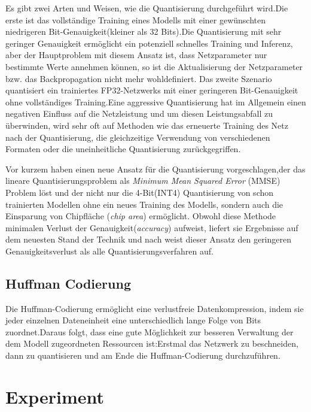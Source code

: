\documentclass[12pt,a4paper]{scrartcl}
\numberwithin{equation}{section}
\begin{document}
Es gibt zwei Arten und Weisen, wie die Quantisierung durchgeführt wird.Die erste ist das vollständige Training eines Modells mit einer gewünschten niedrigeren Bit-Genauigkeit(kleiner als 32 Bits).Die Quantisierung mit sehr geringer Genauigkeit ermöglicht ein potenziell schnelles Training und Inferenz, aber der Hauptproblem mit diesem Ansatz ist, dass Netzparameter nur bestimmte Werte annehmen können, so ist die Aktualisierung der Netzparameter bzw. das Backpropagation nicht mehr wohldefiniert.
Das zweite Szenario  quantisiert ein trainiertes FP32-Netzwerks mit einer geringeren Bit-Genauigkeit ohne vollständiges Training.Eine aggressive Quantisierung hat im Allgemein einen negativen Einfluss auf die Netzleistung und um diesen Leistungsabfall zu überwinden, wird sehr oft auf Methoden wie das erneuerte Training des Netz nach der Quantisierung, die gleichzeitige Verwendung von verschiedenen Formaten oder die uneinheitliche Quantisierung zurückgegriffen.

Vor kurzem haben \cite[Yoni et al]{quantizationYoni} einen neue Ansatz für die Quantisierung vorgeschlagen,der das lineare Quantisierungsproblem als \textit{Minimum Mean Squared Error} (MMSE) Problem löst und der nicht nur die 4-Bit(INT4) Quantisierung von schon trainierten Modellen ohne ein neues Training des Modells, sondern auch die Einsparung von Chipfläche (\textit{chip area}) ermöglicht. Obwohl diese Methode  minimalen Verlust der Genauigkeit(\textit{accuracy}) aufweist, liefert sie Ergebnisse auf dem neuesten Stand der Technik und nach \cite{quantizationYoni} weist dieser Ansatz den geringeren Genauigkeitsverlust als alle Quantisierungsverfahren auf.

\subsection{Huffman Codierung}
Die Huffman-Codierung ermöglicht eine verlustfreie Datenkompression, indem sie jeder einzelnen Dateneinheit  eine unterschiedlich lange Folge von Bits zuordnet.Daraus folgt, dass eine gute Möglichkeit zur besseren Verwaltung der dem Modell zugeordneten Ressourcen ist:Erstmal das Netzwerk zu beschneiden, dann zu quantisieren und am Ende die Huffman-Codierung durchzuführen. 

\section{Experiment} \label{Experiment}
\end{document}
